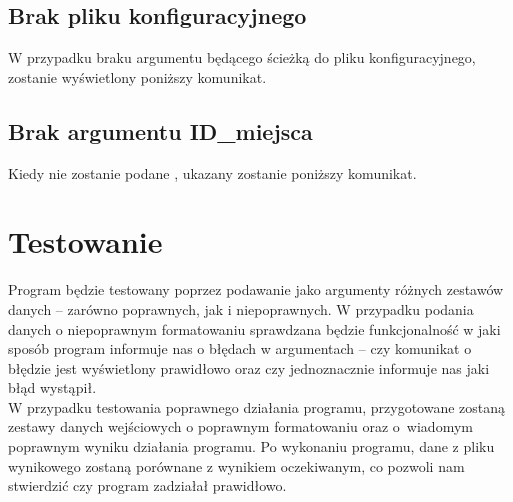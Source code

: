 \documentclass[12pt,a4paper]{article}
\begin{document}
\subsection{Brak pliku konfiguracyjnego}
W przypadku braku argumentu będącego ścieżką do pliku konfiguracyjnego, zostanie wyświetlony poniższy komunikat.\\
\subsection{Brak argumentu ID\_miejsca}
Kiedy nie zostanie podane , ukazany zostanie poniższy komunikat.\\
\section{Testowanie}
Program będzie testowany poprzez podawanie jako argumenty różnych zestawów danych -- zarówno poprawnych, jak i niepoprawnych. W przypadku podania danych o niepoprawnym formatowaniu sprawdzana będzie funkcjonalność w jaki sposób program informuje nas o błędach w argumentach -- czy komunikat o błędzie jest wyświetlony prawidłowo oraz czy jednoznacznie informuje nas jaki błąd wystąpił.\\
\indent W przypadku testowania poprawnego działania programu, przygotowane zostaną zestawy danych wejściowych o poprawnym formatowaniu oraz o~wiadomym poprawnym wyniku działania programu. Po wykonaniu programu, dane z pliku wynikowego zostaną porównane z wynikiem oczekiwanym, co pozwoli nam stwierdzić czy program zadziałał prawidłowo.
\end{document}
